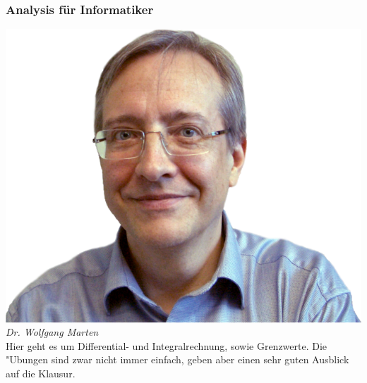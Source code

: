 \subsubsection{Analysis für Informatiker}

\includegraphics[width=0.8\linewidth]{bilder/dozenten/marten_frei.png}\\
\textit{Dr. Wolfgang Marten}\\

Hier geht es um Differential- und Integralrechnung, sowie Grenzwerte.%
Die "Ubungen sind zwar nicht immer einfach, geben aber einen sehr guten Ausblick auf die Klausur.

